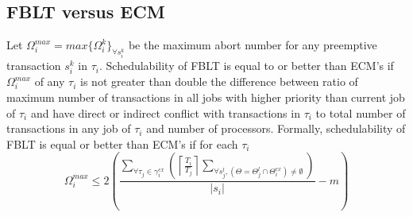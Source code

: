 \subsection{FBLT versus ECM}\label{subsec:fblt_vs_ecm}
%
\begin{clm}\label{clm:fblt_ecm}
Let $\Omega_i^{max}=max\{\Omega_i^k\}_{\forall s_i^k}$ be the maximum abort number for any preemptive transaction $s_i^k$ in $\tau_i$. Schedulability of FBLT is equal to or better than ECM's if $\Omega_i^{max}$ of any $\tau_i$ is not greater than double the difference between ratio of maximum number of transactions in all jobs with higher priority than current job of $\tau_{i}$ and have direct or indirect conflict with transactions in $\tau_{i}$ to total number of transactions in any job of $\tau_i$ and number of processors. Formally, schedulability of FBLT is equal or better than ECM's if for each $\tau_i$ 
%
\begin{equation}
\Omega_{i}^{max}\le2\left(\frac{\sum_{\forall\tau_{j}\in\gamma_{i}^{ex}}\left(\left\lceil \frac{T_{i}}{T_{j}}\right\rceil \sum_{\forall s_{j}^{l},\left(\Theta=\Theta_{j}^{l}\cap\Theta_{i}^{ex}\right)\neq\emptyset}\right)}{|s_{i}|}-m\right)
\label{eq:fblt_ecm_comp_final}
\end{equation}
%
\end{clm}
%
